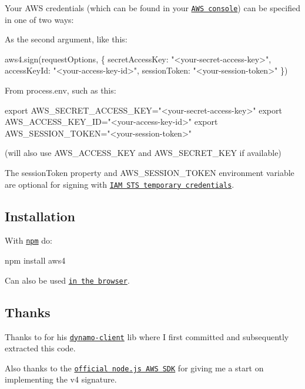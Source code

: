 Your A\+WS credentials (which can be found in your \href{https://portal.aws.amazon.com/gp/aws/securityCredentials}{\tt A\+WS console}) can be specified in one of two ways\+:


\begin{DoxyItemize}
\item As the second argument, like this\+:
\end{DoxyItemize}


\begin{DoxyCode}
aws4.sign(requestOptions, \{
  secretAccessKey: "<your-secret-access-key>",
  accessKeyId: "<your-access-key-id>",
  sessionToken: "<your-session-token>"
\})
\end{DoxyCode}



\begin{DoxyItemize}
\item From {\ttfamily process.\+env}, such as this\+:
\end{DoxyItemize}


\begin{DoxyCode}
export AWS\_SECRET\_ACCESS\_KEY="<your-secret-access-key>"
export AWS\_ACCESS\_KEY\_ID="<your-access-key-id>"
export AWS\_SESSION\_TOKEN="<your-session-token>"
\end{DoxyCode}


(will also use {\ttfamily A\+W\+S\+\_\+\+A\+C\+C\+E\+S\+S\+\_\+\+K\+EY} and {\ttfamily A\+W\+S\+\_\+\+S\+E\+C\+R\+E\+T\+\_\+\+K\+EY} if available)

The {\ttfamily session\+Token} property and {\ttfamily A\+W\+S\+\_\+\+S\+E\+S\+S\+I\+O\+N\+\_\+\+T\+O\+K\+EN} environment variable are optional for signing with \href{http://docs.aws.amazon.com/STS/latest/UsingSTS/using-temp-creds.html}{\tt I\+AM S\+TS temporary credentials}.

\subsection*{Installation }

With \href{http://npmjs.org/}{\tt npm} do\+:


\begin{DoxyCode}
npm install aws4
\end{DoxyCode}


Can also be used \href{./browser}{\tt in the browser}.

\subsection*{Thanks }

Thanks to \href{https://github.com/jed}{\tt } for his \href{https://github.com/jed/dynamo-client}{\tt dynamo-\/client} lib where I first committed and subsequently extracted this code.

Also thanks to the \href{https://github.com/aws/aws-sdk-js}{\tt official node.\+js A\+WS S\+DK} for giving me a start on implementing the v4 signature. 